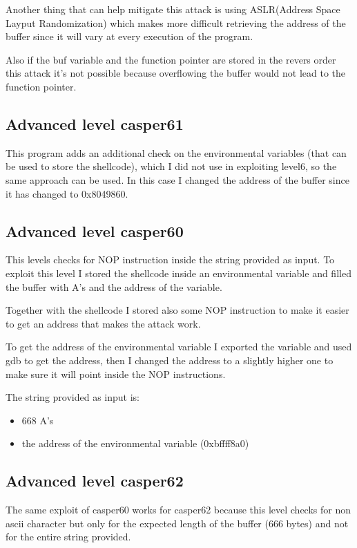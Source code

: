 \documentclass[a4paper,12pt]{article}
\begin{document}
Another thing that can help mitigate this attack is using ASLR(Address Space Layput Randomization)
which makes more difficult retrieving the address of the buffer since it will vary at every execution of the program.

Also if the buf variable and the function pointer are stored in the revers order this attack it's not possible because overflowing the buffer would not lead to the function pointer.

\subsection{Advanced level casper61}

This program adds an additional check on the environmental variables (that can be used to store the shellcode), which I did not use in exploiting level6, so the same approach can be used. In this case I changed the address of the buffer since it has changed to 0x8049860.

\subsection{Advanced level casper60}

This levels checks for NOP instruction inside the string provided as input. To exploit this level I stored the shellcode inside an environmental variable and filled the buffer with A's and the address of the variable.

Together with the shellcode I stored also some NOP instruction to make it easier to get an address that makes the attack work.

To get the address of the environmental variable I exported the variable and used gdb to get the address, then I changed the address to a slightly higher one to make sure it will point inside the NOP instructions.

The string provided as input is:
\begin{itemize}
\item 668 A's
\item the address of the environmental variable (0xbffff8a0)
\end{itemize}

\subsection{Advanced level casper62}

The same exploit of casper60 works for casper62 because this level checks for non ascii character but only for the expected length of the buffer (666 bytes) and not for the entire string provided.
\end{document}
